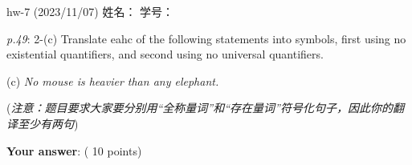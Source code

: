 \documentclass[UTF8,12pt,a4paper]{ctexart}
\begin{document}
	

\begin{center}
hw-7 (2023/11/07) \qquad\qquad 姓名：  \hspace{7em}  学号： 
\end{center}

\emph{p.49}: 2-(c) \quad
Translate eahc of the following statements into symbols, {\color{purple} first} using no existential quantifiers, and {\color{purple} second} using no universal quantifiers. 

\qquad (c) \hspace{3cm}  \textit{No mouse is heavier than any elephant.}

(\textit{注意：题目要求大家要分别用“全称量词”和“存在量词”符号化句子，因此你的翻译至少有两句})

\textbf{Your answer}:   \hfill ({\color{red} 10 points})































\end{document}
